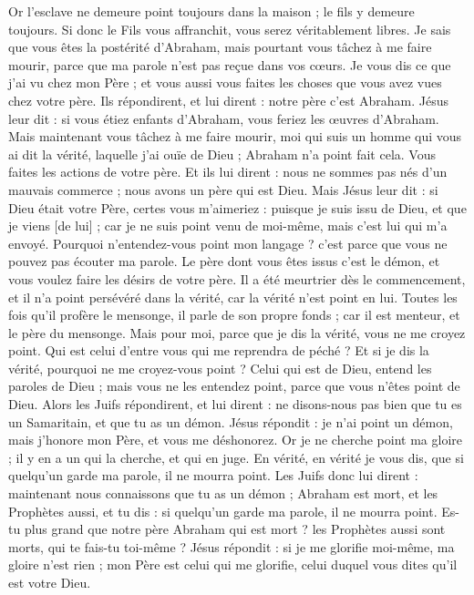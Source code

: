 \begin{multicols}{2}
Or l'esclave ne demeure point toujours dans la maison ; le fils y demeure toujours.
Si donc le Fils vous affranchit, vous serez véritablement libres.
Je sais que vous êtes la postérité d'Abraham, mais pourtant vous tâchez à me faire mourir, parce que ma parole n'est pas reçue dans vos cœurs.
Je vous dis ce que j'ai vu chez mon Père ; et vous aussi vous faites les choses que vous avez vues chez votre père.
Ils répondirent, et lui dirent : notre père c'est Abraham. Jésus leur dit : si vous étiez enfants d'Abraham, vous feriez les œuvres d'Abraham.
Mais maintenant vous tâchez à me faire mourir, moi qui suis un homme qui vous ai dit la vérité, laquelle j'ai ouïe de Dieu ; Abraham n'a point fait cela.
Vous faites les actions de votre père. Et ils lui dirent : nous ne sommes pas nés d'un mauvais commerce ; nous avons un père qui est Dieu.
Mais Jésus leur dit : si Dieu était votre Père, certes vous m'aimeriez : puisque je suis issu de Dieu, et que je viens [de lui] ; car je ne suis point venu de moi-même, mais c'est lui qui m'a envoyé.
Pourquoi n'entendez-vous point mon langage ? c'est parce que vous ne pouvez pas écouter ma parole.
Le père dont vous êtes issus c'est le démon, et vous voulez faire les désirs de votre père. Il a été meurtrier dès le commencement, et il n'a point persévéré dans la vérité, car la vérité n'est point en lui. Toutes les fois qu'il profère le mensonge, il parle de son propre fonds ; car il est menteur, et le père du mensonge.
Mais pour moi, parce que je dis la vérité, vous ne me croyez point.
Qui est celui d'entre vous qui me reprendra de péché ? Et si je dis la vérité, pourquoi ne me croyez-vous point ?
Celui qui est de Dieu, entend les paroles de Dieu ; mais vous ne les entendez point, parce que vous n'êtes point de Dieu.
Alors les Juifs répondirent, et lui dirent : ne disons-nous pas bien que tu es un Samaritain, et que tu as un démon.
Jésus répondit : je n'ai point un démon, mais j'honore mon Père, et vous me déshonorez.
Or je ne cherche point ma gloire ; il y en a un qui la cherche, et qui en juge.
En vérité, en vérité je vous dis, que si quelqu'un garde ma parole, il ne mourra point.
Les Juifs donc lui dirent : maintenant nous connaissons que tu as un démon ; Abraham est mort, et les Prophètes aussi, et tu dis : si quelqu'un garde ma parole, il ne mourra point.
Es-tu plus grand que notre père Abraham qui est mort ? les Prophètes aussi sont morts, qui te fais-tu toi-même ?
Jésus répondit : si je me glorifie moi-même, ma gloire n'est rien ; mon Père est celui qui me glorifie, celui duquel vous dites qu'il est votre Dieu.

\end{multicols}
